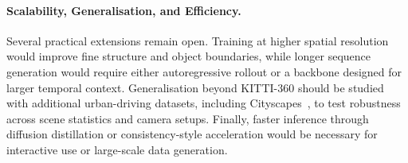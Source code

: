 \paragraph{Scalability, Generalisation, and Efficiency.}
Several practical extensions remain open. Training at higher spatial resolution would improve fine structure and object boundaries, while longer sequence generation would require either autoregressive rollout or a backbone designed for larger temporal context. Generalisation beyond KITTI-360 should be studied with additional urban-driving datasets, including Cityscapes~\cite{cordts2016cityscapes}, to test robustness across scene statistics and camera setups. Finally, faster inference through diffusion distillation or consistency-style acceleration would be necessary for interactive use or large-scale data generation.
